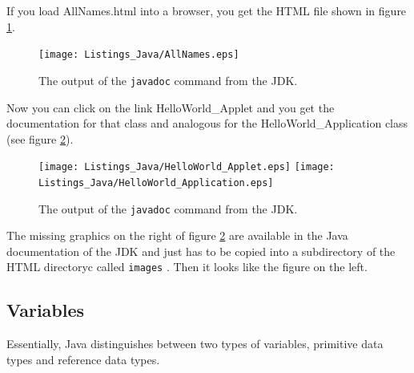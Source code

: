 If you load AllNames.html into a browser, you get the HTML file shown
in figure \ref{fig:javadoc1}.
\begin{figure}[htbp]
  \begin{center}
    \leavevmode
 \texttt{[image: Listings\_Java/AllNames.eps]} 
    \caption{The output of the \texttt{javadoc} command from the JDK.}
    \label{fig:javadoc1}
  \end{center}
\end{figure}
Now you can click on the link HelloWorld\_Applet and you get the
documentation for that class and analogous for the HelloWorld\_Application
class (see figure \ref{fig:javadoc2}).
\begin{figure}[htbp]
  \begin{center}
    \leavevmode
  \texttt{[image: Listings\_Java/HelloWorld\_Applet.eps]}
  \texttt{[image: Listings\_Java/HelloWorld\_Application.eps]}
    \caption{The output of the \texttt{javadoc} command from the JDK.}
    \label{fig:javadoc2}
  \end{center}
\end{figure}
The missing graphics on the right of figure \ref{fig:javadoc2} 
are available in the Java documentation of the
JDK and just has to be copied into a subdirectory  
of the HTML directoryc called \verb|images| . 
Then it looks like the figure on the left.


\subsection{Variables}
\label{sec:Variables}

Essentially, Java distinguishes between two types of variables,
primitive data types and reference data types.
